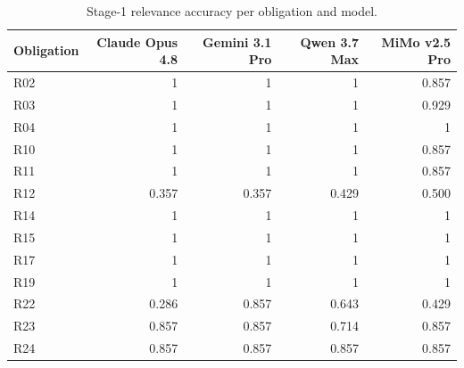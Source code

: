 \begin{table}[htbp]
  \centering
  \caption{Stage-1 relevance accuracy per obligation and model.}
  \label{tab:relevance-per-req}
  \begin{tabular}{lrrrr}
    \toprule
    Obligation & Claude Opus 4.8 & Gemini 3.1 Pro & Qwen 3.7 Max & MiMo v2.5 Pro \\
    \midrule
    R02 & 1 & 1 & 1 & 0.857 \\
    R03 & 1 & 1 & 1 & 0.929 \\
    R04 & 1 & 1 & 1 & 1 \\
    R10 & 1 & 1 & 1 & 0.857 \\
    R11 & 1 & 1 & 1 & 0.857 \\
    R12 & 0.357 & 0.357 & 0.429 & 0.500 \\
    R14 & 1 & 1 & 1 & 1 \\
    R15 & 1 & 1 & 1 & 1 \\
    R17 & 1 & 1 & 1 & 1 \\
    R19 & 1 & 1 & 1 & 1 \\
    R22 & 0.286 & 0.857 & 0.643 & 0.429 \\
    R23 & 0.857 & 0.857 & 0.714 & 0.857 \\
    R24 & 0.857 & 0.857 & 0.857 & 0.857 \\
    \bottomrule
  \end{tabular}
\end{table}

